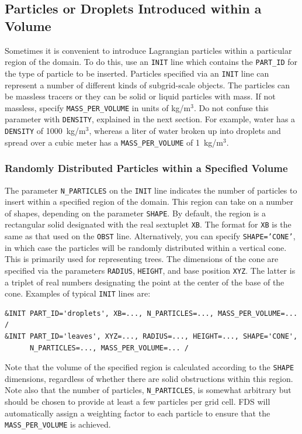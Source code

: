 \documentclass[11pt]{book}
\newcommand{\ct}{\tt\small}
\begin{document}
\subsection{Particles or Droplets Introduced within a Volume}
\label{info:initial_droplets}

Sometimes it is convenient to introduce Lagrangian particles within a particular region of the domain. To do this, use an {\ct INIT} line which contains the {\ct PART\_ID} for the type of particle to be inserted. Particles specified via an {\ct INIT} line can represent a number of different kinds of subgrid-scale objects. The particles can be massless tracers or they can be solid or liquid particles with mass. If not massless, specify {\ct MASS\_PER\_VOLUME} in units of kg/m$^3$. Do not confuse this parameter with {\ct DENSITY}, explained in the next section.
For example, water has a {\ct DENSITY} of 1000~kg/m$^3$, whereas a liter of water broken up into droplets and spread over a cubic meter has a {\ct MASS\_PER\_VOLUME} of 1~kg/m$^3$.

\subsubsection{Randomly Distributed Particles within a Specified Volume}

The parameter {\ct N\_PARTICLES} on the {\ct INIT} line indicates the number of particles to insert within a specified region of the domain. This region can take on a number of shapes, depending on the parameter {\ct SHAPE}. By default, the region is a rectangular solid designated with the real sextuplet {\ct XB}.
The format for {\ct XB} is the same as that used on the {\ct OBST} line. Alternatively, you can specify {\ct SHAPE='CONE'}, in which case the particles will be randomly distributed within a vertical cone. This is primarily used for representing trees. The dimensions of the cone are specified via the parameters {\ct RADIUS}, {\ct HEIGHT}, and base position {\ct XYZ}. The latter is a triplet of real numbers designating the point at the center of the base of the cone. Examples of typical {\ct INIT} lines are:

\footnotesize
\begin{verbatim}
&INIT PART_ID='droplets', XB=..., N_PARTICLES=..., MASS_PER_VOLUME=... /
&INIT PART_ID='leaves', XYZ=..., RADIUS=..., HEIGHT=..., SHAPE='CONE',
      N_PARTICLES=..., MASS_PER_VOLUME=... /
\end{verbatim} \normalsize

\noindent
Note that the volume of the specified region is calculated according to the {\ct SHAPE} dimensions, regardless of whether there are solid obstructions within this region. Note also that the number of particles, {\ct N\_PARTICLES}, is somewhat arbitrary but should be chosen to provide at least a few particles per grid cell. FDS will automatically assign a weighting factor to each particle to ensure that the {\ct MASS\_PER\_VOLUME} is achieved.
\end{document}
